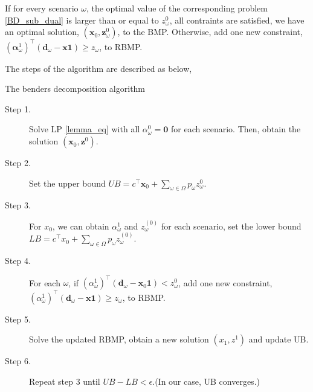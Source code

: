 If for every scenario $\omega$, the optimal value of the corresponding problem \eqref{BD_sub_dual} is larger than or equal to $z_{\omega}^{0}$, all contraints are satisfied, we have an optimal solution, $(\mathbf{x}_{0}, \mathbf{z}_{\omega}^{0})$, to the BMP. Otherwise, add one new constraint, $(\bm{\alpha}_{\omega}^{1})^{\intercal}(\mathbf{d}_{\omega}- \mathbf{x} \mathbf{1}) \geq z_{\omega}$, to RBMP.




The steps of the algorithm are described as below,

\begin{algorithm}[H]\label{cut_algo}
  \caption{The benders decomposition algorithm}
    \begin{description}
    \item[Step 1.] Solve LP \eqref{lemma_eq} with all $\alpha_{\omega}^0 = \mathbf{0}$ for each scenario.
    Then, obtain the solution $(\mathbf{x}_0, \mathbf{z}^{0})$.

    \item[Step 2.] Set the upper bound $UB = c^{\intercal} \mathbf{x}_0 + \sum_{\omega \in \Omega} p_{\omega} z_{\omega}^{0}$.
    \item[Step 3.] 
    For $x_0$, we can obtain $\alpha_{\omega}^{1}$ and $z_{\omega}^{(0)}$ for each scenario, set the lower bound $LB = c^{\intercal} x_0 + \sum_{\omega \in \Omega} p_{\omega} z_{\omega}^{(0)}$.
    \item[Step 4.]
    For each $\omega$, if $(\alpha_{\omega}^{1})^{\intercal}(\mathbf{d}_{\omega}- \mathbf{x}_0 \mathbf{1}) < z_{\omega}^{0}$, add one new constraint, $(\alpha_{\omega}^{1})^{\intercal}(\mathbf{d}_{\omega}- \mathbf{x} \mathbf{1}) \geq z_{\omega}$, to RBMP.
    \item[Step 5.] Solve the updated RBMP, obtain a new solution $(x_1, z^{1})$ and update UB.
    \item[Step 6.] Repeat step 3 until $UB - LB < \epsilon$.(In our case, UB converges.)
   \end{description}
  \end{algorithm}

